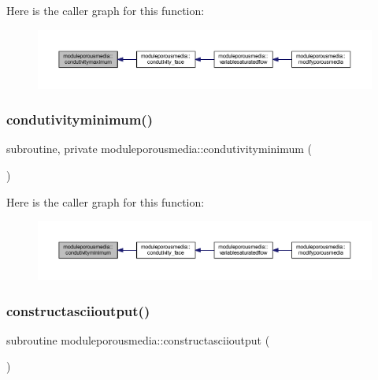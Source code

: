 Here is the caller graph for this function\+:\nopagebreak
\begin{figure}[H]
\begin{center}
\leavevmode
\includegraphics[width=350pt]{namespacemoduleporousmedia_ae2e67be2f15dbdf148268d5b0fe82c68_icgraph}
\end{center}
\end{figure}
\mbox{\label{namespacemoduleporousmedia_acd65a0f6af171e6aea2cd5784f58fcc3}} 
\subsubsection{\texorpdfstring{condutivityminimum()}{condutivityminimum()}}
{\footnotesize\ttfamily subroutine, private moduleporousmedia\+::condutivityminimum (\begin{DoxyParamCaption}{ }\end{DoxyParamCaption})\hspace{0.3cm}{\ttfamily [private]}}

Here is the caller graph for this function\+:\nopagebreak
\begin{figure}[H]
\begin{center}
\leavevmode
\includegraphics[width=350pt]{namespacemoduleporousmedia_acd65a0f6af171e6aea2cd5784f58fcc3_icgraph}
\end{center}
\end{figure}
\mbox{\label{namespacemoduleporousmedia_a14d726826714b21efcb1bdd8fe521dbc}} 
\subsubsection{\texorpdfstring{constructasciioutput()}{constructasciioutput()}}
{\footnotesize\ttfamily subroutine moduleporousmedia\+::constructasciioutput (\begin{DoxyParamCaption}{ }\end{DoxyParamCaption})\hspace{0.3cm}{\ttfamily [private]}}

